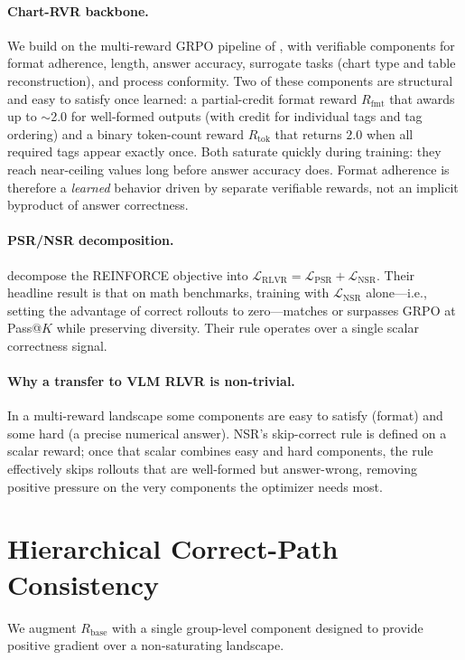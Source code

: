\documentclass[11pt]{article}
\begin{document}
\paragraph{Chart-RVR backbone.} We build on the multi-reward GRPO
pipeline of \citet{chartrvr2025}, with verifiable components for
format adherence, length, answer accuracy, surrogate tasks (chart type
and table reconstruction), and process conformity. Two of these
components are structural and easy to satisfy once learned: a
partial-credit format reward $R_{\text{fmt}}$ that awards up to
$\sim$2.0 for well-formed outputs (with credit for individual tags
and tag ordering) and a binary token-count reward $R_{\text{tok}}$
that returns $2.0$ when all required tags appear exactly once. Both
saturate quickly during training: they reach near-ceiling values long
before answer accuracy does. Format adherence is therefore a
\emph{learned} behavior driven by separate verifiable rewards, not an
implicit byproduct of answer correctness.

\paragraph{PSR/NSR decomposition.} \citet{zhu2025nsr} decompose the
REINFORCE objective into $\mathcal{L}_{\text{RLVR}} =
\mathcal{L}_{\text{PSR}} + \mathcal{L}_{\text{NSR}}$. Their headline
result is that on math benchmarks, training with
$\mathcal{L}_{\text{NSR}}$ alone---i.e., setting the advantage of
correct rollouts to zero---matches or surpasses GRPO at Pass@$K$ while
preserving diversity. Their rule operates over a single scalar
correctness signal.

\paragraph{Why a transfer to VLM RLVR is non-trivial.} In a
multi-reward landscape some components are easy to satisfy (format)
and some hard (a precise numerical answer). NSR's skip-correct rule is
defined on a scalar reward; once that scalar combines easy and hard
components, the rule effectively skips rollouts that are well-formed
but answer-wrong, removing positive pressure on the very components
the optimizer needs most.

\section{Hierarchical Correct-Path Consistency}
\label{sec:hcpc}

We augment $R_{\text{base}}$ with a single group-level component
designed to provide positive gradient over a non-saturating landscape.
\end{document}
